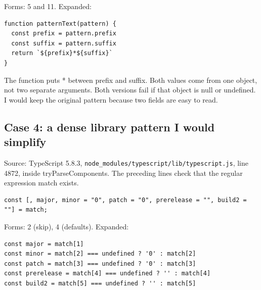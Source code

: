 \documentclass[
  10pt,
  a4paper,
]{article}
\begin{document}
Forms: 5 and 11. Expanded:

\begin{minipage}{\linewidth}

\begin{lstlisting}
function patternText(pattern) {
  const prefix = pattern.prefix
  const suffix = pattern.suffix
  return `${prefix}*${suffix}`
}
\end{lstlisting}

\end{minipage}\par

The function puts * between prefix and suffix. Both values come from one
object, not two separate arguments. Both versions fail if that object is
null or undefined. I would keep the original pattern because two fields
are easy to read.

\subsection{Case 4: a dense library pattern I would
simplify}\label{case-4-a-dense-library-pattern-i-would-simplify}

Source: TypeScript 5.8.3,
\texttt{node\_modules/\allowbreak{}typescript/\allowbreak{}lib/\allowbreak{}typescript.\allowbreak{}js},
line 4872, inside tryParseComponents. The preceding lines check that the
regular expression match exists.

\begin{minipage}{\linewidth}

\begin{lstlisting}
const [, major, minor = "0", patch = "0", prerelease = "", build2 = ""] = match;
\end{lstlisting}

\end{minipage}\par

Forms: 2 (skip), 4 (defaults). Expanded:

\begin{minipage}{\linewidth}

\begin{lstlisting}
const major = match[1]
const minor = match[2] === undefined ? '0' : match[2]
const patch = match[3] === undefined ? '0' : match[3]
const prerelease = match[4] === undefined ? '' : match[4]
const build2 = match[5] === undefined ? '' : match[5]
\end{lstlisting}

\end{minipage}\par
\end{document}
